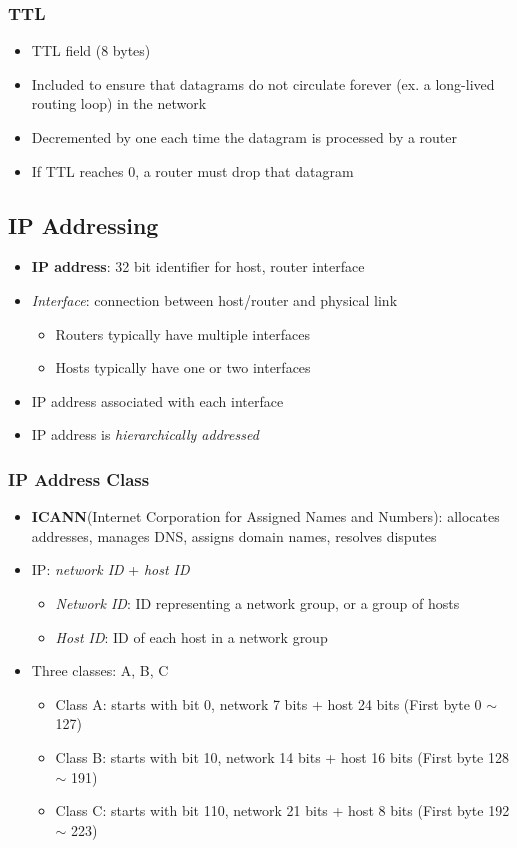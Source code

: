 \subsubsection{TTL}
\begin{itemize}
	\item TTL field (8 bytes)
	\item Included to ensure that datagrams do not circulate forever (ex. a long-lived routing loop) in the network
	\item Decremented by one each time the datagram is processed by a router
	\item If TTL reaches 0, a router must drop that datagram
\end{itemize}

\subsection{IP Addressing}
\begin{itemize}
	\item \textbf{IP address}: 32 bit identifier for host, router interface
	\item \textit{Interface}: connection between host/router and physical link
	\begin{itemize}
		\item Routers typically have multiple interfaces
		\item Hosts typically have one or two interfaces
	\end{itemize}
	\item IP address associated with each interface
	\item IP address is \textit{hierarchically addressed}
\end{itemize}

\subsubsection{IP Address Class}
\begin{itemize}
	\item \textbf{ICANN}(Internet Corporation for Assigned Names and Numbers): allocates addresses, manages DNS, assigns domain names, resolves disputes
	\item IP: \textit{network ID} + \textit{host ID}
	\begin{itemize}
		\item \textit{Network ID}: ID representing a network group, or a group of hosts
		\item \textit{Host ID}: ID of each host in a network group
	\end{itemize}
	\item Three classes: A, B, C
	\begin{itemize}
		\item Class A: starts with bit 0, network 7 bits + host 24 bits (First byte 0 \(\sim\) 127)
		\item Class B: starts with bit 10, network 14 bits + host 16 bits (First byte 128 \(\sim\) 191)
		\item Class C: starts with bit 110, network 21 bits + host 8 bits (First byte 192 \(\sim\) 223)
	\end{itemize}
\end{itemize}

